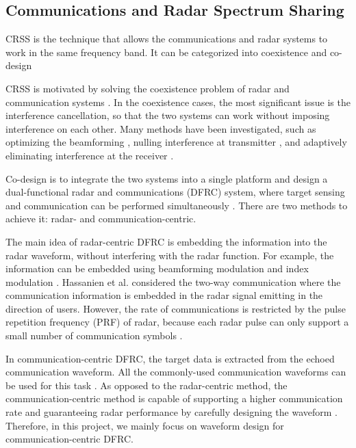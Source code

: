 \subsection{Communications and Radar Spectrum Sharing}
CRSS is the technique that allows the communications and radar systems 
to work in the same frequency band. It can be categorized into coexistence 
and co-design

CRSS is motivated by solving the coexistence problem of radar and 
communication systems \cite{feng2020survey}. In the coexistence cases, the most significant 
issue is the interference cancellation, so that the two systems can 
work without imposing interference on each other. Many methods have been investigated, such as 
optimizing the beamforming \cite{rihan2018optimum,qian2018joint,li2016optimum,li2017joint,liu2018mimo}, 
nulling interference at transmitter \cite{sodagari2012projection, mahal2017spectral}, 
and adaptively eliminating interference at the receiver \cite{deng2013interference,meager2016estimation,nartasilpa2018let}.

Co-design is to integrate the two systems into a single platform and design a dual-functional radar and communications (DFRC) system,
where target sensing and communication can be performed simultaneously \cite{Hassanien2019DFRC}. There are two methods to achieve it:
radar- and communication-centric.

The main idea of radar-centric DFRC is embedding the information into the radar waveform, without
interfering with the radar function. For example, the information can be embedded using beamforming modulation and index modulation \cite{Hassanien2019DFRC}. 
Hassanien et al. \cite{Hassanien2018} considered the two-way communication where the communication information is embedded in 
the radar signal emitting in the direction of users.
However, the rate of communications is restricted by the pulse repetition frequency (PRF) of radar,
because each radar pulse can only support a small number of communication symbols \cite{liu2020beamforming}.   

In communication-centric DFRC, the target data is extracted from the echoed communication waveform. 
All the commonly-used communication waveforms can be used for this task \cite{liu2020tutorial}. 
As opposed to the radar-centric method, the communication-centric method 
is capable of supporting a higher communication rate and guaranteeing radar performance by carefully designing the waveform \cite{liu2020beamforming}. 
Therefore, in this project, we mainly focus on waveform design for communication-centric DFRC.

